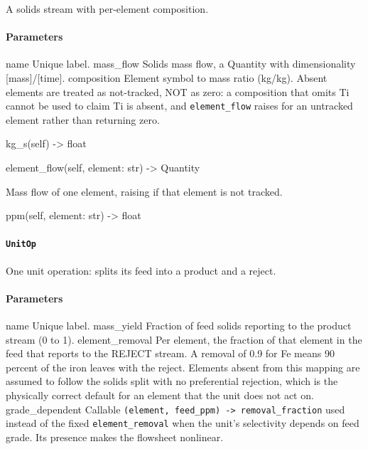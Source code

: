 \documentclass[10pt,a4paper,twoside]{report}
\begin{document}
A solids stream with per-element composition.

\paragraph*{Parameters}

name Unique label. mass\_flow Solids mass flow, a Quantity with dimensionality [mass]/[time]. composition Element symbol to mass ratio (kg/kg). Absent elements are treated as not-tracked, NOT as zero: a composition that omits Ti cannot be used to claim Ti is absent, and \texttt{element\_flow} raises for an untracked element rather than returning zero.

\begin{verbatimsmall}
kg_s(self) -> float
\end{verbatimsmall}

\begin{verbatimsmall}
element_flow(self, element: str) -> Quantity
\end{verbatimsmall}

Mass flow of one element, raising if that element is not tracked.

\begin{verbatimsmall}
ppm(self, element: str) -> float
\end{verbatimsmall}

\paragraph{\texttt{UnitOp}}

One unit operation: splits its feed into a product and a reject.

\paragraph*{Parameters}

name Unique label. mass\_yield Fraction of feed solids reporting to the product stream (0 to 1). element\_removal Per element, the fraction of that element in the feed that reports to the REJECT stream. A removal of 0.9 for Fe means 90 percent of the iron leaves with the reject. Elements absent from this mapping are assumed to follow the solids split with no preferential rejection, which is the physically correct default for an element that the unit does not act on. grade\_dependent Callable \texttt{(element, feed\_ppm) -> removal\_fraction} used instead of the fixed \texttt{element\_removal} when the unit's selectivity depends on feed grade. Its presence makes the flowsheet nonlinear.
\end{document}
